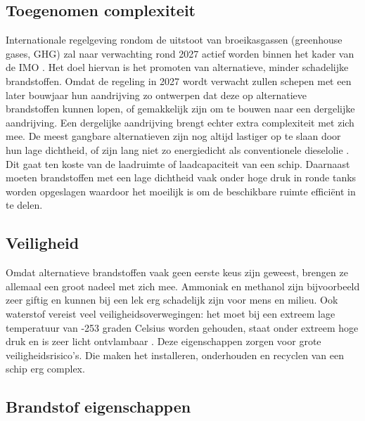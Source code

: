 \documentclass[a4paper]{IMDC2024}
\begin{document}
\subsection{Toegenomen complexiteit}
Internationale regelgeving rondom de uitstoot van broeikasgassen (greenhouse gases, GHG) zal naar verwachting rond 2027 actief worden binnen het kader van de IMO \citep{mckenney2024}. Het doel hiervan is het promoten van alternatieve, minder schadelijke brandstoffen. Omdat de regeling in 2027 wordt verwacht zullen schepen met een later bouwjaar hun aandrijving zo ontwerpen dat deze op alternatieve brandstoffen kunnen lopen, of gemakkelijk zijn om te bouwen naar een dergelijke aandrijving. Een dergelijke aandrijving brengt echter extra complexiteit met zich mee. De meest gangbare alternatieven zijn nog altijd lastiger op te slaan door hun lage dichtheid, of zijn lang niet zo energiedicht als conventionele dieselolie \citep{vanhoecke2021challenges}. Dit gaat ten koste van de laadruimte of laadcapaciteit van een schip. Daarnaast moeten brandstoffen met een lage dichtheid vaak onder hoge druk in ronde tanks worden opgeslagen waardoor het moeilijk is om de beschikbare ruimte efficiënt in te delen.

\subsection{Veiligheid}
Omdat alternatieve brandstoffen vaak geen eerste keus zijn geweest, brengen ze allemaal een groot nadeel met zich mee. Ammoniak en methanol zijn bijvoorbeeld zeer giftig en kunnen bij een lek erg schadelijk zijn voor mens en milieu. Ook waterstof vereist veel veiligheidsoverwegingen: het moet bij een extreem lage temperatuur van -253 graden Celsius worden gehouden, staat onder extreem hoge druk en is zeer licht ontvlambaar \citep{vanhoecke2021challenges}. Deze eigenschappen zorgen voor grote veiligheidsrisico's. Die maken het installeren, onderhouden en recyclen van een schip erg complex.

\subsection{Brandstof eigenschappen}
\end{document}
